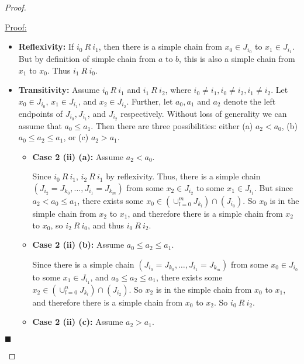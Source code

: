 \documentclass[12pt]{article}
\newenvironment{claimproof}[1]{\par\noindent\underline{Proof:}\space#1}{\hfill $\blacksquare$}
\begin{document}
\begin{proof}
\begin{itemize}[label={},leftmargin=8mm, itemsep=1em, parsep=1em]
\begin{claimproof}
\begin{itemize}[label={},leftmargin=4mm, itemsep=1em, parsep=1em]
\item {\bf Reflexivity:} If $i_{0}\ R\ i_{1}$, then there is a simple chain from
$x_{0}\in J_{i_{0}}$ to $x_{1} \in J_{i_{1}}$. But by definition of simple chain
from $a$ to $b$, this is also a simple chain from $x_{1}$ to $x_{0}$. Thus
$i_{1}\ R\ i_{0}$.

\item {\bf Transitivity:} Assume $i_{0}\ R\ i_{1}$ and $i_{1}\ R\ i_{2}$, where
$i_{0}\neq i_{1}, i_{0} \neq i_{2}, i_{1}\neq i_{2}$. Let $x_{0} \in J_{i_{0}}$, $x_{1} \in J_{i_{1}}$,
and $x_{2} \in J_{i_{2}}$. Further, let $a_{0}, a_{1}$ and $a_{2}$ denote the
left endpoints of $J_{i_{0}}, J_{i_{1}}$, and $J_{i_{2}}$ respectively. Without
loss of generality we can assume that $a_{0} \leq a_{1}$. Then there are three
possibilities: either (a) $a_{2} < a_{0}$, (b) $a_{0} \leq a_{2} \leq a_{1}$, or
(c) $a_{2} > a_{1}$.

\begin{itemize}[label={},leftmargin=4mm, itemsep=1em, parsep=1em]
\item {\bf Case 2 (ii) (a):} Assume $a_{2} < a_{0}$.

Since $i_{0}\ R\ i_{1}$, $i_{2}\ R\ i_{1}$ by reflexivity. Thus, there is a
simple chain $(J_{i_{2}} = J_{k_{0}}, \dots, J_{i_{1}} = J_{k_{m}})$ from some
$x_{2} \in J_{i_{2}}$ to some $x_{1} \in J_{i_{1}}$. But since $a_{2} < a_{0}
\leq a_{1}$, there exists some $x_{0} \in
\left(\cup_{l=0}^{m}J_{k_{l}}\right)\cap \left(J_{i_{0}}\right)$. So $x_{0}$ is
in the simple chain from $x_{2}$ to $x_{1}$, and therefore there is a simple
chain from $x_{2}$ to $x_{0}$, so $i_{2}\ R\ i_{0}$, and thus $i_{0}\ R\ i_{2}$.

\item {\bf Case 2 (ii) (b):} Assume $a_{0} \leq a_{2} \leq a_{1}$.

Since there is a simple chain $(J_{i_{0}} = J_{k_{0}}, \dots, J_{i_{1}} =
J_{k_{m}})$ from some $x_{0} \in J_{i_{0}}$ to some $x_{1} \in J_{i_{1}}$, and
$a_{0} \leq a_{2} \leq a_{1}$, there exists some $x_{2} \in
\left(\cup_{l=0}^{n}J_{k_{l}}\right)\cap\left(J_{i_{2}}\right)$. So $x_{2}$ is
in the simple chain from $x_{0}$ to $x_{1}$, and therefore there is a simple
chain from $x_{0}$ to $x_{2}$. So $i_{0}\ R\ i_{2}$.

\item {\bf Case 2 (ii) (c):} Assume $a_{2} > a_{1}$.


\end{itemize}
\end{itemize}
\end{claimproof}
\end{itemize}
\end{proof}
\end{document}
